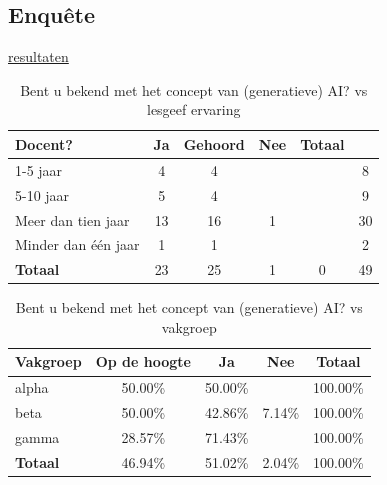 \documentclass[12pt]{article}
\begin{document}
\pagebreak
\subsection{Enquête}
\href{https://docs.google.com/spreadsheets/d/10Z6uwL6eRiDsPIC6HQ5hyizUN8RciJKFSDRZBGiKdDI}{resultaten}

\noindent
\begin{table}[H]
    \caption{Bent u bekend met het concept van (generatieve) AI? vs lesgeef ervaring}
    \begin{tabular}{l c c c c c}
        \toprule
        \textbf{Docent?} & \textbf{Ja} & \textbf{Gehoord} & \textbf{Nee} & \textbf{Totaal} \\
        \midrule
        1-5 jaar      & 4  & 4  &   &   & 8  \\
        5-10 jaar     & 5  & 4  &   &   & 9  \\
        Meer dan tien jaar & 13 & 16 & 1 &   & 30 \\
        Minder dan één jaar & 1  & 1  &   &   & 2  \\
        \midrule
        \textbf{Totaal} & 23 & 25 & 1 & 0 & 49 \\
        \bottomrule
    \end{tabular}
\end{table}

\noindent
\begin{table}[H]
    \caption{Bent u bekend met het concept van (generatieve) AI? vs vakgroep}

    \begin{tabular}{l c c c c}
        \toprule
        \textbf{Vakgroep} & \textbf{Op de hoogte} & \textbf{Ja} & \textbf{Nee} & \textbf{Totaal} \\
        \midrule
        alpha & 50.00\% & 50.00\% &  & 100.00\% \\
        beta  & 50.00\% & 42.86\% & 7.14\% & 100.00\% \\
        gamma & 28.57\% & 71.43\% &  & 100.00\% \\
        \midrule
        \textbf{Totaal} & 46.94\% & 51.02\% & 2.04\% & 100.00\% \\
        \bottomrule
    \end{tabular}
\end{table}
\end{document}
